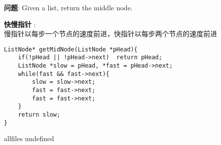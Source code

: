 \documentclass{article}
\begin{document}
\begin{CJK}{UTF8}{gbsn}     %

\else
    
\begin{description}
    \item{\textbf{问题}}: Given a list, return the middle node.
    \item{\textbf{快慢指针}} : 
    \\慢指针以每步一个节点的速度前进，快指针以每步两个节点的速度前进
    \begin{lstlisting}
ListNode* getMidNode(ListNode *pHead){
	if(!pHead || !pHead->next)	return pHead;
	ListNode *slow = pHead, *fast = pHead->next;
	while(fast && fast->next){
		slow = slow->next;
		fast = fast->next;
		fast = fast->next;
	}
	return slow;
}
    \end{lstlisting}
    \textit{}
\end{description}

\fi

\ifx allfiles undefined
\end{CJK}
\end{document}
